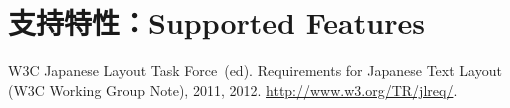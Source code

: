 \documentclass{ltjsarticle}
\begin{document}
\section{支持特性：Supported Features}\label{sec:feat}

\begin{thebibliography}{99}
     W3C Japanese Layout Task Force~(ed). \newblock Requirements for Japanese Text Layout (W3C Working Group Note), 2011, 2012. \newblock \url{http://www.w3.org/TR/jlreq/}.
\end{thebibliography}
\end{document}
